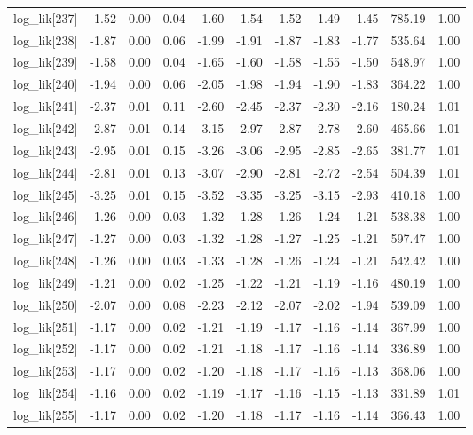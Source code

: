 \begin{table}[ht]
\begin{tabular}{rrrrrrrrrrr}
  log\_lik[237] & -1.52 & 0.00 & 0.04 & -1.60 & -1.54 & -1.52 & -1.49 & -1.45 & 785.19 & 1.00 \\ 
  log\_lik[238] & -1.87 & 0.00 & 0.06 & -1.99 & -1.91 & -1.87 & -1.83 & -1.77 & 535.64 & 1.00 \\ 
  log\_lik[239] & -1.58 & 0.00 & 0.04 & -1.65 & -1.60 & -1.58 & -1.55 & -1.50 & 548.97 & 1.00 \\ 
  log\_lik[240] & -1.94 & 0.00 & 0.06 & -2.05 & -1.98 & -1.94 & -1.90 & -1.83 & 364.22 & 1.00 \\ 
  log\_lik[241] & -2.37 & 0.01 & 0.11 & -2.60 & -2.45 & -2.37 & -2.30 & -2.16 & 180.24 & 1.01 \\ 
  log\_lik[242] & -2.87 & 0.01 & 0.14 & -3.15 & -2.97 & -2.87 & -2.78 & -2.60 & 465.66 & 1.01 \\ 
  log\_lik[243] & -2.95 & 0.01 & 0.15 & -3.26 & -3.06 & -2.95 & -2.85 & -2.65 & 381.77 & 1.01 \\ 
  log\_lik[244] & -2.81 & 0.01 & 0.13 & -3.07 & -2.90 & -2.81 & -2.72 & -2.54 & 504.39 & 1.01 \\ 
  log\_lik[245] & -3.25 & 0.01 & 0.15 & -3.52 & -3.35 & -3.25 & -3.15 & -2.93 & 410.18 & 1.00 \\ 
  log\_lik[246] & -1.26 & 0.00 & 0.03 & -1.32 & -1.28 & -1.26 & -1.24 & -1.21 & 538.38 & 1.00 \\ 
  log\_lik[247] & -1.27 & 0.00 & 0.03 & -1.32 & -1.28 & -1.27 & -1.25 & -1.21 & 597.47 & 1.00 \\ 
  log\_lik[248] & -1.26 & 0.00 & 0.03 & -1.33 & -1.28 & -1.26 & -1.24 & -1.21 & 542.42 & 1.00 \\ 
  log\_lik[249] & -1.21 & 0.00 & 0.02 & -1.25 & -1.22 & -1.21 & -1.19 & -1.16 & 480.19 & 1.00 \\ 
  log\_lik[250] & -2.07 & 0.00 & 0.08 & -2.23 & -2.12 & -2.07 & -2.02 & -1.94 & 539.09 & 1.00 \\ 
  log\_lik[251] & -1.17 & 0.00 & 0.02 & -1.21 & -1.19 & -1.17 & -1.16 & -1.14 & 367.99 & 1.00 \\ 
  log\_lik[252] & -1.17 & 0.00 & 0.02 & -1.21 & -1.18 & -1.17 & -1.16 & -1.14 & 336.89 & 1.00 \\ 
  log\_lik[253] & -1.17 & 0.00 & 0.02 & -1.20 & -1.18 & -1.17 & -1.16 & -1.13 & 368.06 & 1.00 \\ 
  log\_lik[254] & -1.16 & 0.00 & 0.02 & -1.19 & -1.17 & -1.16 & -1.15 & -1.13 & 331.89 & 1.01 \\ 
  log\_lik[255] & -1.17 & 0.00 & 0.02 & -1.20 & -1.18 & -1.17 & -1.16 & -1.14 & 366.43 & 1.00 \\ 

\end{tabular}
\end{table}

